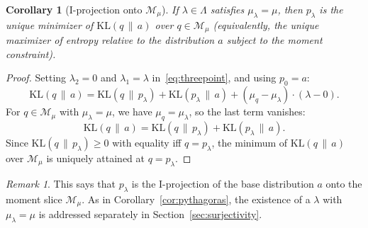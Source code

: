 \documentclass[11pt, a4paper, 
onecolumn, 
showabstract]{naverlabseurope-onecol-flex}
\newtheorem{corollary}[theorem]{Corollary}
\theoremstyle{definition}
\theoremstyle{remark}
\newtheorem{remark}[theorem]{Remark}
\newcommand{\KL}[2]{\mathrm{KL}\!\left(#1 \,\|\, #2\right)}
\newcommand{\cM}{\mathcal{M}}
\begin{document}
\begin{corollary}[I-projection onto $\cM_\mu$]\label{cor:maxent}
If $\lambda \in \Lambda$ satisfies $\mu_\lambda = \mu$, then $p_\lambda$ is the unique minimizer of $\KL{q}{a}$ over $q \in \cM_\mu$ (equivalently, the unique maximizer of entropy relative to the distribution $a$ subject to the moment constraint).
\end{corollary}

\begin{proof}
Setting $\lambda_2 = 0$ and $\lambda_1 = \lambda$ in~\eqref{eq:threepoint}, and using $p_0 = a$:
\[
    \KL{q}{a}
    = \KL{q}{p_\lambda} + \KL{p_\lambda}{a}
      + (\mu_q - \mu_\lambda) \cdot (\lambda - 0).
\]
For $q \in \cM_\mu$ with $\mu_\lambda = \mu$, we have $\mu_q = \mu_\lambda$, so the last term vanishes:
\[
    \KL{q}{a} = \KL{q}{p_\lambda} + \KL{p_\lambda}{a}.
\]
Since $\KL{q}{p_\lambda} \geq 0$ with equality iff $q = p_\lambda$, the minimum of $\KL{q}{a}$ over $\cM_\mu$ is uniquely attained at $q = p_\lambda$.
\end{proof}

\begin{remark}
This says that $p_\lambda$ is the I-projection of the base distribution $a$ onto the moment slice $\cM_\mu$.
As in Corollary~\ref{cor:pythagoras}, the existence of a $\lambda$ with $\mu_\lambda = \mu$ is addressed separately in Section~\ref{sec:surjectivity}.
\end{remark}
\end{document}
